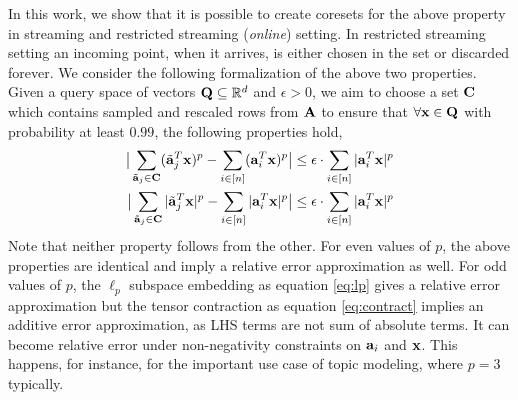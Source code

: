 In this work, we show that it is possible to create coresets for the above property in streaming and restricted streaming ({\em online}) setting. In restricted streaming setting an incoming point, when it arrives, is either chosen in the set or discarded forever. We consider the following formalization of the above two properties. Given a query space of vectors $\mathbf{Q}\subseteq \mathbb{R}^{d}$ and $\epsilon > 0$, we aim to choose a set $\mathbf{C}$ which contains sampled and rescaled rows from $\mathbf{A}$ to ensure that $\forall \mathbf{x} \in \mathbf{Q}$ with probability at least $0.99$, the following properties hold,
\begin{align}
    \big|\sum_{\tilde{\mathbf{a}}_{j} \in \mathbf{C}}(\tilde{\mathbf{a}}_{j}^T\mathbf{x})^p - \sum_{i \in [n]}(\mathbf{a}_{i}^T \mathbf{x})^p\big| \leq \epsilon \cdot \sum_{i \in [n]}|\mathbf{a}_{i}^T \mathbf{x}|^p  \label{eq:contract} \\
    \big|\sum_{\tilde{\mathbf{a}}_{j} \in \mathbf{C}}|\tilde{\mathbf{a}}_{j}^T\mathbf{x}|^p - \sum_{i \in [n]}|\mathbf{a}_{i}^T \mathbf{x}|^p\big| \leq \epsilon \cdot \sum_{i \in [n]}|\mathbf{a}_{i}^T \mathbf{x}|^p  \label{eq:lp}
\end{align}
Note that neither property follows from the other. For even values of $p$, the above properties are identical and imply a relative error approximation as well. For odd values of $p$, the $\ell_{p}$ subspace embedding as equation \eqref{eq:lp} gives a relative error approximation but the tensor contraction as equation \eqref{eq:contract} implies an additive error approximation, as LHS terms are not sum of absolute terms. It can become relative error under non-negativity constraints on $\mathbf{a}_{i}$ and $\mathbf{x}$. This happens, for instance, for the important use case of topic modeling, where $p=3$ typically.
% 
